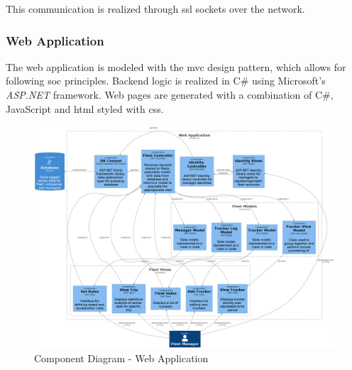  This communication is realized through \ac{ssl} sockets over the network.

\pagebreak
\subsubsection{Web Application}
The web application is modeled with the \ac{mvc} design pattern, which allows for following \ac{soc} principles.
Backend logic is realized in C\# using Microsoft's \textit{ASP.NET} framework.
Web pages are generated with a combination of C\#, JavaScript and \ac{html} styled with \ac{css}.

\begin{figure}[H]
\centering
\includegraphics[width=6in]{../diag/webapp_component.png}
\caption{Component Diagram - Web Application}
\label{fig:webapp_component}
\end{figure}

